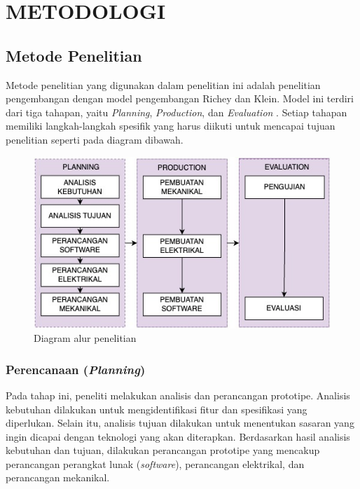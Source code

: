 \chapter{METODOLOGI}

\section{Metode Penelitian}
\sloppy
Metode penelitian yang digunakan dalam penelitian ini adalah penelitian pengembangan dengan model pengembangan Richey dan Klein. Model ini terdiri dari tiga tahapan, yaitu \emph{Planning}, \emph{Production}, dan \emph{Evaluation} \cite{Sugiyono2019}. Setiap tahapan memiliki langkah-langkah spesifik yang harus diikuti untuk mencapai tujuan penelitian seperti pada diagram dibawah.

\begin{figure} [H] \centering
  \includegraphics[scale=0.7]{gambar/method_diagram.jpg}
  \caption{Diagram alur penelitian}
  \label{fig:Diagram alur penelitian}
\end{figure}

\subsection{Perencanaan (\emph{Planning})}
Pada tahap ini, peneliti melakukan analisis dan perancangan prototipe. Analisis kebutuhan dilakukan untuk mengidentifikasi fitur dan spesifikasi yang diperlukan. Selain itu, analisis tujuan dilakukan untuk menentukan sasaran yang ingin dicapai dengan teknologi yang akan diterapkan. Berdasarkan hasil analisis kebutuhan dan tujuan, dilakukan perancangan prototipe yang mencakup perancangan perangkat lunak (\emph{software}), perancangan elektrikal, dan perancangan mekanikal.

